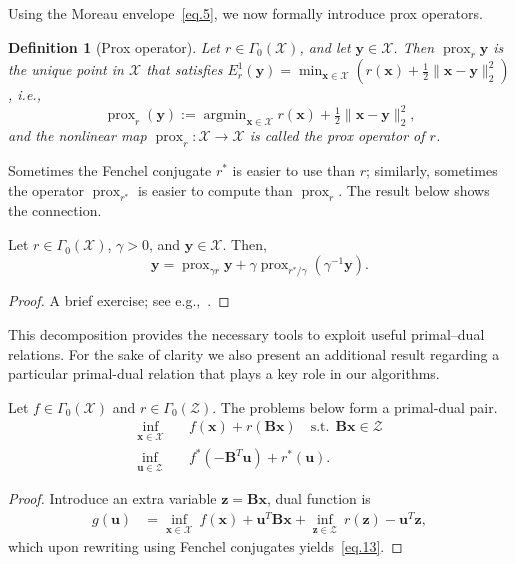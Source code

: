 \documentclass[twoside,11pt]{article}
\newcommand{\vu}{\bm{u}}       \newcommand{\vuh}{\hat{\bm{u}}}        \newcommand{\uh}{\hat{u}}    \newcommand{\vut}{\tilde{\bm{u}}}       \newcommand{\ut}{\tilde{u}}
\newcommand{\vx}{\bm{x}}       \newcommand{\vxh}{\hat{\bm{x}}}        \newcommand{\xh}{\hat{x}}    \newcommand{\vxt}{\tilde{\bm{x}}}       \newcommand{\xt}{\tilde{x}}
\newcommand{\vy}{\bm{y}}       \newcommand{\vyh}{\hat{\bm{y}}}        \newcommand{\yh}{\hat{y}}    \newcommand{\vyt}{\tilde{\bm{y}}}       \newcommand{\yt}{\tilde{y}}
\newcommand{\vz}{\bm{z}}       \newcommand{\vzh}{\hat{\bm{z}}}        \newcommand{\zh}{\hat{z}}    \newcommand{\vzt}{\tilde{\bm{z}}}       \newcommand{\zt}{\tilde{z}}
\newcommand{\Xc}{\mathcal{X}}
\newcommand{\Zc}{\mathcal{Z}}
\newcommand{\mb}{\bm{B}}
\newcommand{\mynorm}[2]{\| {#1} \|_{#2}}
\newcommand{\enorm}[1]{\mynorm{#1}{2}}
\DeclareMathOperator*{\argmin}{argmin}
\DeclareMathOperator{\prox}{prox}
\newcommand{\half}{\tfrac{1}{2}}
\newtheorem{defn}[theorem]{Definition}
\numberwithin{equation}{section}
\numberwithin{theorem}{section}
\begin{document}
\noindent Using the Moreau envelope~\eqref{eq.5}, we now formally introduce prox operators.
\begin{defn}[Prox operator]
  Let $r \in \Gamma_0(\Xc)$, and let $\vy \in \Xc$. Then $\prox_r \vy$ is the unique point in $\Xc$ that satisfies $E_r^1(\vy) = \min_{\vx \in \Xc}(r(\vx) + \half\enorm{\vx-\vy}^2)$, i.e.,
  \begin{equation}
    \label{eq.6}
    \prox_r(\vy) := \argmin_{\vx \in \Xc} r(\vx) + \half\enorm{\vx-\vy}^2,
  \end{equation}
  and the nonlinear map $\prox_r : \Xc \to \Xc$ is called the \emph{prox operator} of $r$.
\end{defn}

Sometimes the Fenchel conjugate $r^*$ is easier to use than $r$; similarly, sometimes the operator $\prox_{r^*}$ is easier to compute than $\prox_r$. The result below shows the connection.
\begin{proposition}
  \label{prop.decomp}
  Let $r \in \Gamma_0(\Xc)$, $\gamma > 0$, and $\vy \in \Xc$. Then,
  \begin{equation}
    \label{eq.10}
    \vy = \prox_{\gamma r}\vy + \gamma\prox_{r^*/\gamma}(\gamma^{-1}\vy).
  \end{equation}
\end{proposition}
\begin{proof}
  A brief exercise; see e.g.,~\citep[Thm.~14.3]{bauCom}.
\end{proof}

\noindent This decomposition provides the necessary tools to exploit useful primal--dual relations. For the sake of clarity we also present an additional result regarding a particular primal-dual relation that plays a key role in our algorithms.
\begin{proposition}
  \label{prop.pd}
  Let $f \in \Gamma_0(\Xc)$ and $r \in \Gamma_0(\Zc)$. The problems below form a primal-dual pair.
  \begin{align}
    \label{eq.12}
    \inf_{\vx \in \Xc}\quad &f(\vx) + r(\bm{Bx})\quad \text{s.t.}\ \ \bm{Bx} \in \Zc\\
    \label{eq.13}
    \inf_{\vu \in \Zc}\quad &f^*(-\bm{B}^T\vu) + r^*(\vu).
  \end{align}
\end{proposition}
\begin{proof}
  Introduce an extra variable $\vz = \mb\vx$, %
  dual function is
  \begin{align*}
    g(\vu) &=\inf_{\vx \in \Xc}\ f(\vx) + \vu^T\mb \vx + \inf_{\vz \in \Zc}\ r(\vz) - \vu^T\vz,
  \end{align*}
  which upon rewriting using Fenchel conjugates yields~\eqref{eq.13}. %
\end{proof}
\end{document}
